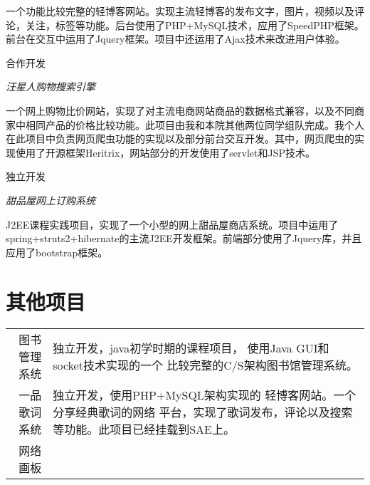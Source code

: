 \documentclass[10pt]{article} %
\begin{document}
{\begin{minipage}[t]{0.5\textwidth}
\normalsize{一个功能比较完整的轻博客网站。实现主流轻博客的发布文字，图片，视频以及评论，关注，标签等功能。后台使用了PHP+MySQL技术，应用了SpeedPHP框架。前台在交互中运用了Jquery框架。项目中还运用了Ajax技术来改进用户体验。}\\


{\raggedleft\textsc{合作开发}\par}

{\raggedright\large \textit{汪星人购物搜索引擎}\\[5pt]}

\normalsize{一个网上购物比价网站，实现了对主流电商网站商品的数据格式兼容，以及不同商家中相同产品的价格比较功能。此项目由我和本院其他两位同学组队完成。我个人在此项目中负责网页爬虫功能的实现以及部分前台交互开发。其中，网页爬虫的实现使用了开源框架Heritrix，网站部分的开发使用了servlet和JSP技术。}\\


{\raggedleft\textsc{独立开发}\par}

{\raggedright\large \textit{甜品屋网上订购系统}\\[5pt]}

\normalsize{J2EE课程实践项目，实现了一个小型的网上甜品屋商店系统。项目中运用了spring+struts2+hibernate的主流J2EE开发框架。前端部分使用了Jquery库，并且应用了bootstrap框架。}\\



\section{其他项目} 

\begin{tabular}{rl}
     图书管理系统 & 
     \begin{minipage}[t]{0.72\textwidth}
     独立开发，java初学时期的课程项目，
     使用Java GUI和socket技术实现的一个
     比较完整的C/S架构图书馆管理系统。
     \end{minipage}
     \\
     一品歌词系统 & 
     \begin{minipage}[t]{0.72\textwidth}
     独立开发，使用PHP+MySQL架构实现的
     轻博客网站。一个分享经典歌词的网络
     平台，实现了歌词发布，评论以及搜索
     等功能。此项目已经挂载到SAE上。
     \end{minipage}
     \\
     网络画板     & 
     \begin{minipage}[t]{0.72\textwidth}


\end{minipage}
\end{tabular}
\end{minipage}}
\end{document}
